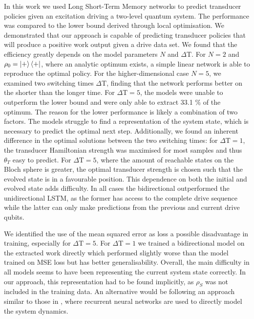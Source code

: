 In this work we used Long Short-Term Memory networks to predict transducer policies given an excitation driving a two-level quantum system.
The performance was compared to the lower bound derived through local optimisation.
We demonstrated that our approach is capable of predicting transducer policies that will produce a positive work output given a drive data set.
We found that the efficiency greatly depends on the model parameters $N$ and $\Delta \mathrm{T}$.
For $N=2$ and $\rho_0 = \ket{+}\bra{+}$, where an analytic optimum exists, a simple linear network is able to reproduce the optimal policy.
For the higher-dimensional case $N=5$, we examined two switching times $\Delta \mathrm{T}$, finding that the network performs better on the shorter than the longer time.
For $\Delta \mathrm{T} = 5$, the models were unable to outperform the lower bound and were only able to extract 33.1 \% of the optimum.
The reason for the lower performance is likely a combination of two factors.
The models struggle to find a representation of the system state, which is necessary to predict the optimal next step.
Additionally, we found an inherent difference in the optimal solutions between the two switching times: for $\Delta \mathrm{T} = 1$, the transducer Hamiltonian strength was maximised for most samples and thus $\theta_T$ easy to predict.
For $\Delta \mathrm{T} = 5$, where the amount of reachable states on the Bloch sphere is greater, the optimal transducer strength is chosen such that the evolved state is in a favourable position.
This dependence on both the initial and evolved state adds difficulty.
In all cases the bidirectional outperformed the unidirectional LSTM, as the former has access to the complete drive sequence while the latter can only make predictions from the previous and current drive qubits.

We identified the use of the mean squared error as loss a possible disadvantage in training, especially for $\Delta \mathrm{T} = 5$.
For $\Delta \mathrm{T} = 1$ we trained a bidirectional model on the extracted work directly which performed slightly worse than the model trained on MSE loss but has better generalisability.
Overall, the main difficulty in all models seems to have been representing the current system state correctly.
In our approach, this representation had to be found implicitly, as $\rho_S$ was not included in the training data.
An alternative would be following an approach similar to those in \cite{Banchi_2018, PhysRevX.10.011006}, where recurrent neural networks are used to directly model the system dynamics.

